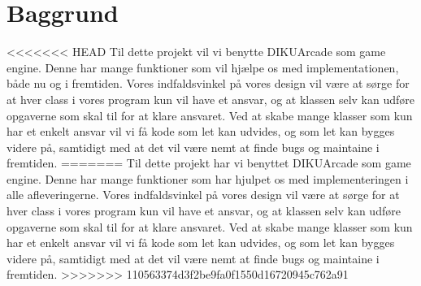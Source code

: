 \section{Baggrund}
<<<<<<< HEAD
Til dette projekt vil vi benytte DIKUArcade som game engine. Denne har mange funktioner som vil hjælpe os med implementationen, både nu og i fremtiden. Vores indfaldsvinkel på vores design vil være at sørge for at hver class i vores program kun vil have et ansvar, og at klassen selv kan udføre opgaverne som skal til for at klare ansvaret. Ved at skabe mange klasser som kun har et enkelt ansvar vil vi få kode som let kan udvides, og som let kan bygges videre på, samtidigt med at det vil være nemt at finde bugs og maintaine i fremtiden. 
=======
Til dette projekt har vi benyttet DIKUArcade som game engine. Denne har mange funktioner som har hjulpet os med implementeringen i alle afleveringerne. Vores indfaldsvinkel på vores design vil være at sørge for at hver class i vores program kun vil have et ansvar, og at klassen selv kan udføre opgaverne som skal til for at klare ansvaret. Ved at skabe mange klasser som kun har et enkelt ansvar vil vi få kode som let kan udvides, og som let kan bygges videre på, samtidigt med at det vil være nemt at finde bugs og maintaine i fremtiden. 
>>>>>>> 110563374d3f2be9fa0f1550d16720945c762a91

